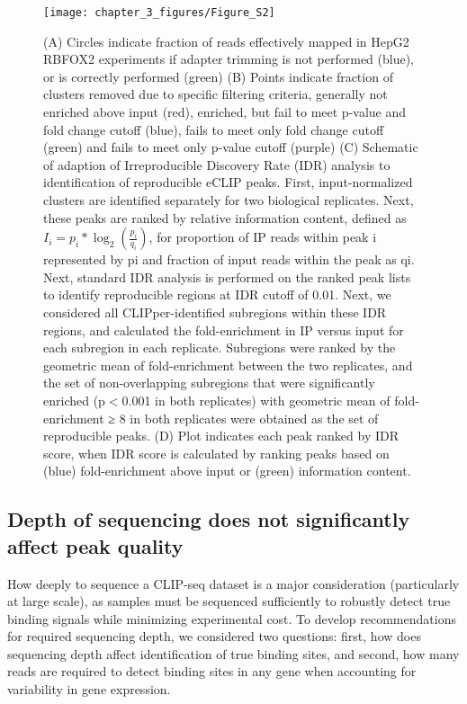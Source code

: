 \begin{figure}[ht]
  \centering
  \texttt{[image: chapter\_3\_figures/Figure\_S2]}
  \caption[Supplementary Figure 2. Development of the eCLIP processing pipeline]{(A) Circles indicate fraction of reads effectively mapped in HepG2 RBFOX2 experiments if adapter trimming is not performed (blue), or is correctly performed (green) (B) Points indicate fraction of clusters removed due to specific filtering criteria, generally not enriched above input (red), enriched, but fail to meet p-value and fold change cutoff (blue), fails to meet only fold change cutoff (green) and fails to meet only p-value cutoff (purple) (C) Schematic of adaption of Irreproducible Discovery Rate (IDR) analysis to identification of reproducible eCLIP peaks. First, input-normalized clusters are identified separately for two biological replicates. Next, these peaks are ranked by relative information content, defined as $I_i=p_i*\log_2(\frac{p_i}{q_i})$, for proportion of IP reads within peak i represented by pi and fraction of input reads within the peak as qi. Next, standard IDR analysis is performed on the ranked peak lists to identify reproducible regions at IDR cutoff of 0.01. Next, we considered all CLIPper-identified subregions within these IDR regions, and calculated the fold-enrichment in IP versus input for each subregion in each replicate. Subregions were ranked by the geometric mean of fold-enrichment between the two replicates, and the set of non-overlapping subregions that were significantly enriched (p$<$0.001 in both replicates) with geometric mean of fold-enrichment ≥ 8 in both replicates were obtained as the set of reproducible peaks. (D) Plot indicates each peak ranked by IDR score, when IDR score is calculated by ranking peaks based on (blue) fold-enrichment above input or (green) information content.}
  \label{fig:Figure_S2}
\end{figure}


\subsection{Depth of sequencing does not significantly affect peak quality}
How deeply to sequence a CLIP-seq dataset is a major consideration (particularly at large scale), as samples must be sequenced sufficiently to robustly detect true binding signals while minimizing experimental cost. To develop recommendations for required sequencing depth, we considered two questions: first, how does sequencing depth affect identification of true binding sites, and second, how many reads are required to detect binding sites in any gene when accounting for variability in gene expression.

